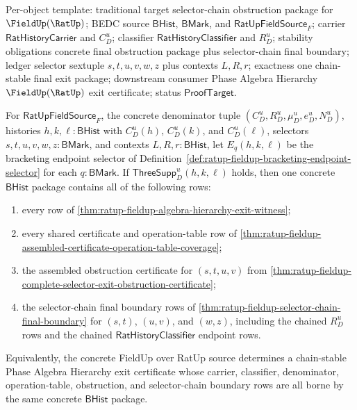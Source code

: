 Per-object template: traditional target selector-chain obstruction package for
$\FieldUp(\RatUp)$; BEDC source $\mathsf{BHist}$, $\mathsf{BMark}$, and
$\mathsf{RatUpFieldSource}_F$; carrier $\mathsf{RatHistoryCarrier}$ and
$C_D^u$; classifier $\mathsf{RatHistoryClassifier}$ and $R_D^u$; stability
obligations concrete final obstruction package plus selector-chain final
boundary; ledger selector sextuple $s,t,u,v,w,z$ plus contexts $L,R,r$;
exactness one chain-stable final exit package; downstream consumer Phase Algebra
Hierarchy $\FieldUp(\RatUp)$ exit certificate; status $\mathsf{ProofTarget}$.

\begin{theorem}
\label{thm:ratup-fieldup-algebra-hierarchy-chain-stable-exit}
For $\mathsf{RatUpFieldSource}_F$, the concrete denominator tuple
$(C_D^u,R_D^u,\mu_D^u,e_D^u,N_D^u)$, histories
$h,k,\ell:\mathsf{BHist}$ with $C_D^u(h)$, $C_D^u(k)$, and $C_D^u(\ell)$,
selectors $s,t,u,v,w,z:\mathsf{BMark}$, and contexts
$L,R,r:\mathsf{BHist}$, let $E_q(h,k,\ell)$ be the bracketing endpoint selector
of Definition~\ref{def:ratup-fieldup-bracketing-endpoint-selector} for each
$q:\mathsf{BMark}$. If $\mathsf{ThreeSupp}_D^u(h,k,\ell)$ holds, then one
concrete $\mathsf{BHist}$ package contains all of the following rows:
\begin{enumerate}
  \item every row of
  \autoref{thm:ratup-fieldup-algebra-hierarchy-exit-witness};
  \item every shared certificate and operation-table row of
  \autoref{thm:ratup-fieldup-assembled-certificate-operation-table-coverage};
  \item the assembled obstruction certificate for $(s,t,u,v)$ from
  \autoref{thm:ratup-fieldup-complete-selector-exit-obstruction-certificate};
  \item the selector-chain final boundary rows of
  \autoref{thm:ratup-fieldup-selector-chain-final-boundary} for $(s,t)$,
  $(u,v)$, and $(w,z)$, including the chained $R_D^u$ rows and the chained
  $\mathsf{RatHistoryClassifier}$ endpoint rows.
\end{enumerate}
Equivalently, the concrete FieldUp over RatUp source determines a
chain-stable Phase Algebra Hierarchy exit certificate whose carrier,
classifier, denominator, operation-table, obstruction, and selector-chain
boundary rows are all borne by the same concrete $\mathsf{BHist}$ package.
\end{theorem}
